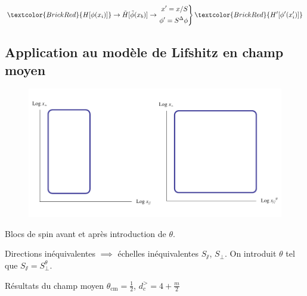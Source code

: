 \documentclass[xcolor=dvipsnames]{beamer}
\begin{document}
\begin{frame}
\[ \textcolor{BrickRed}{H[\phi(x_i)]} \rightarrow \tilde{H}[\tilde{\phi}(x_b)]  \rightarrow \left.\begin{aligned}
        x' = x/S \\
        \phi' = S^\Delta \phi
       \end{aligned}
 \right\}
  \textcolor{BrickRed}{H'[\phi'(x'_i)]} \]
\end{frame}

\subsection{Application au modèle de Lifshitz en champ moyen}
\begin{frame}

\begin{figure}[htp]
\centering
\includegraphics[scale=0.4]{img/blockspin_theta.pdf}
\label{}
\end{figure}
\begin{center}
Blocs de spin avant et après introduction de $\theta$.
\end{center}

\begin{block}{}
Directions inéquivalentes $\implies$ échelles inéquivalentes $S_\sslash$, $S_\perp$. \newline On introduit $\theta$ tel que $S_\sslash = S_\perp^\theta$. 
\end{block} 

\begin{block}{Résultats du champ moyen}
\centering
$\theta_\text{cm} = \frac{1}{2}$, $d_c^> = 4 + \frac{m}{2}$
\end{block}
\end{frame}
\end{document}
